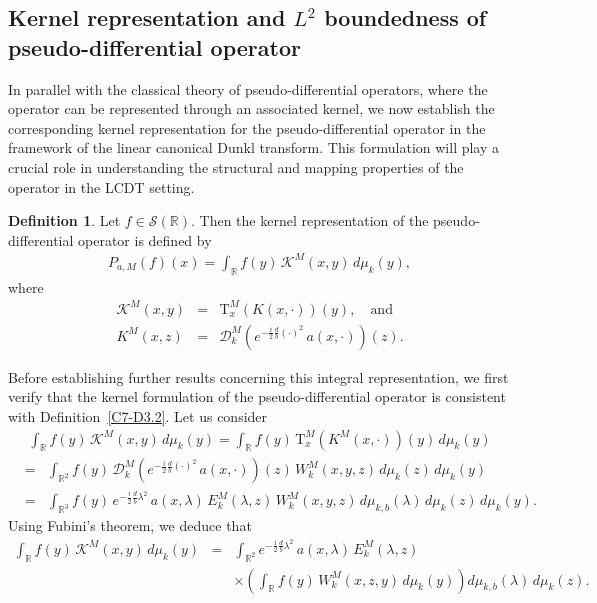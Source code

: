 \documentclass[12pt,a4paper,reqno]{amsproc}
\theoremstyle{definition}
\newtheorem{definition}[theorem]{Definition}
\theoremstyle{remark}
\numberwithin{equation}{section}
\newcommand{\Tau}{\mathrm{T}}
\begin{document}
\subsection{Kernel representation and $L^2$ boundedness of 
pseudo-differential operator}
In parallel with the classical theory of pseudo-differential operators, where the operator can be represented through an associated kernel, we now establish the corresponding kernel representation for the pseudo-differential operator in the framework of the linear canonical Dunkl transform. This formulation will play a crucial role in understanding the structural and mapping properties of the operator in the LCDT setting. 
\begin{definition}
Let $f\in \mathcal{S}(\mathbb{R})$. Then the kernel representation of the pseudo-differential operator is defined by    
\begin{eqnarray*}
 P_{a,M}(f)(x) =\int_{\mathbb{R}}f(y)\, \mathcal{K}^M(x,y)\,d\mu_k(y),    
\end{eqnarray*}
where
\begin{eqnarray*}
\mathcal{K}^M(x,y) &=&  \Tau_x^M(K(x,\cdot))(y), \quad\text{and}\\
K^M(x,z) &=& \mathcal{D}_k^M(e^{-\frac{i}{2}\frac{d}{b}(\cdot)^2}\,a(x,\cdot))(z).
\end{eqnarray*}
\end{definition}
Before establishing further results concerning this integral representation, we first verify that the kernel formulation of the pseudo-differential operator is consistent with Definition~\ref{C7-D3.2}.  Let us consider
\begin{eqnarray*}
\int_{\mathbb{R}}f(y)\, \mathcal{K}^M(x,y)\,d\mu_k(y) = \int_{\mathbb{R}}f(y)\,\Tau_x^M(K^M(x,\cdot))(y)\,d\mu_k(y)
\end{eqnarray*}
\begin{eqnarray*}
&=&\int_{\mathbb{R}^2} f(y)\,\mathcal{D}_k^M(e^{-\frac{i}{2}\frac{d}{b}(\cdot)^2}\,a(x,\cdot))(z)\,W_k^M(x,y,z)\,d\mu_k(z)\,d\mu_k(y)\\
&=& \int_{\mathbb{R}^3} f(y)\,e^{-\frac{i}{2}\frac{d}{b}\lambda^2}\,a(x,\lambda)\, E_k^M(\lambda,z)\,W_k^M(x,y,z)\,d\mu_{k,b}(\lambda)\,d\mu_k(z)\,d\mu_k(y).
\end{eqnarray*}
Using  Fubini's theorem, we deduce that
\begin{eqnarray*}
\int_{\mathbb{R}}f(y)\, \mathcal{K}^M(x,y)\,d\mu_k(y)&=& \int_{\mathbb{R}^2} e^{-\frac{i}{2}\frac{d}{b}\lambda^2}\,a(x,\lambda)\,E_k^M(\lambda,z)\\&& \times\left(\int_{\mathbb{R}}f(y)\, W_k^M(x,z,y)\,d\mu_k(y)\right)d\mu_{k,b}(\lambda)\,d\mu_k(z).
\end{eqnarray*}
\end{document}
